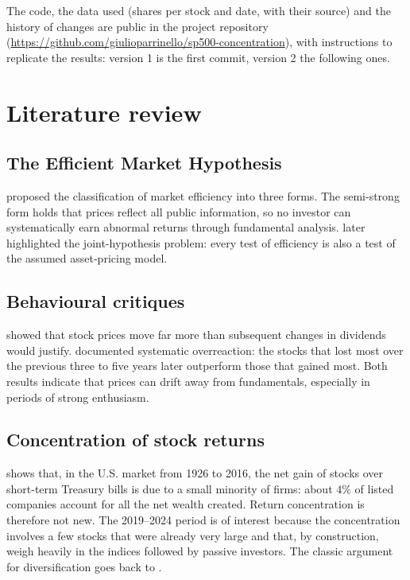 \documentclass[12pt, a4paper]{article}
\begin{document}
The code, the data used (shares per stock and date, with their source) and the history of changes are public in the project repository (\url{https://github.com/giulioparrinello/sp500-concentration}), with instructions to replicate the results: version 1 is the first commit, version 2 the following ones.

\section{Literature review}

\subsection{The Efficient Market Hypothesis}

\citet{fama1970} proposed the classification of market efficiency into three forms. The semi-strong form holds that prices reflect all public information, so no investor can systematically earn abnormal returns through fundamental analysis. \citet{fama1991} later highlighted the joint-hypothesis problem: every test of efficiency is also a test of the assumed asset-pricing model.

\subsection{Behavioural critiques}

\citet{shiller1981} showed that stock prices move far more than subsequent changes in dividends would justify. \citet{debondt1985} documented systematic overreaction: the stocks that lost most over the previous three to five years later outperform those that gained most. Both results indicate that prices can drift away from fundamentals, especially in periods of strong enthusiasm.

\subsection{Concentration of stock returns}

\citet{bessembinder2018} shows that, in the U.S. market from 1926 to 2016, the net gain of stocks over short-term Treasury bills is due to a small minority of firms: about $4\%$ of listed companies account for all the net wealth created. Return concentration is therefore not new. The 2019--2024 period is of interest because the concentration involves a few stocks that were already very large and that, by construction, weigh heavily in the indices followed by passive investors. The classic argument for diversification goes back to \citet{markowitz1952}.
\end{document}
